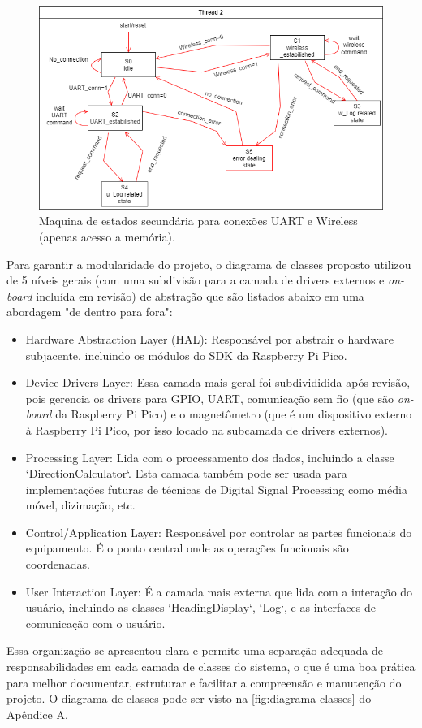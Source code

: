 \documentclass[10pt,twocolumn,letterpaper]{article}
\begin{document}
\begin{figure}[h]
  \centering
  \includegraphics[width=\linewidth]{figures/maquina_estados2.2.png}
  \caption{Maquina de estados secundária para conexões UART e Wireless (apenas acesso a memória).}
  \label{fig:maquina_estados2}
\end{figure}


Para garantir a modularidade do projeto, o diagrama de classes proposto utilizou de 5 níveis gerais (com uma subdivisão para a camada de drivers externos e \emph{on-board} incluída em revisão) de abstração que são listados abaixo em uma abordagem "de dentro para fora":
\begin{itemize}
  \item Hardware Abstraction Layer (HAL): Responsável por abstrair o hardware subjacente, incluindo os módulos do SDK da Raspberry Pi Pico.
  \item Device Drivers Layer: Essa camada mais geral foi subdivididida após revisão, pois gerencia os drivers para GPIO, UART, comunicação sem fio (que são \emph{on-board} da Raspberry Pi Pico) e o magnetômetro (que é um dispositivo externo à Raspberry Pi Pico, por isso locado na subcamada de drivers externos).
  \item Processing Layer: Lida com o processamento dos dados, incluindo a classe `DirectionCalculator`. Esta camada também pode ser usada 
  para implementações futuras de técnicas de Digital Signal Processing como média móvel, dizimação, etc.
  \item Control/Application Layer: Responsável por controlar as partes funcionais do equipamento. É o ponto central onde as operações 
  funcionais são coordenadas. 
  \item User Interaction Layer: É a camada mais externa que lida com a interação do usuário, incluindo as classes `HeadingDisplay`, `Log`, 
  e as interfaces de comunicação com o usuário.
\end{itemize}
Essa organização se apresentou clara e permite uma separação adequada de responsabilidades em cada camada de classes do sistema, 
o que é uma boa prática para melhor documentar, estruturar e facilitar a compreensão e manutenção do projeto. O diagrama de classes 
pode ser visto na \autoref{fig:diagrama-classes} do Apêndice A.
\end{document}
